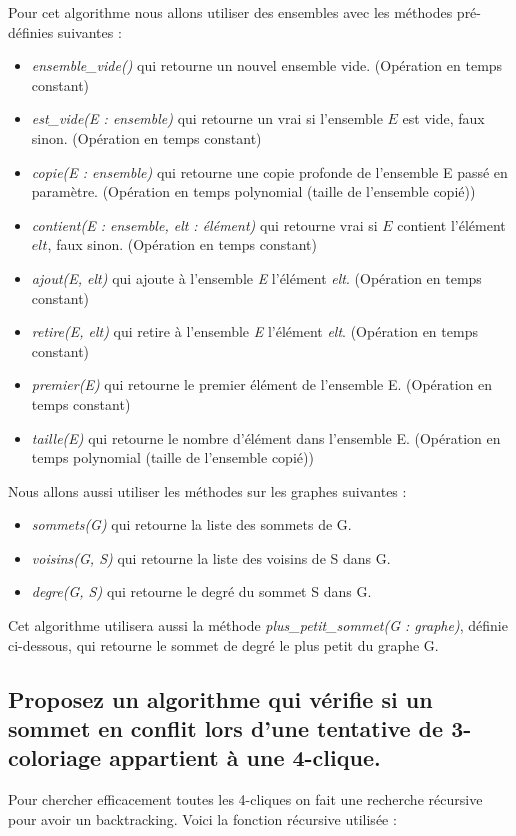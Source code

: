 \documentclass[a4paper, 11pt]{article}
\begin{document}
    Pour cet algorithme nous allons utiliser des ensembles avec les méthodes pré-définies suivantes :
    \begin{itemize}
        \item \emph{ensemble\_vide()} qui retourne un nouvel ensemble vide. (Opération en temps constant)
        \item \emph{est\_vide(E : ensemble)} qui retourne un vrai si l'ensemble $E$ est vide, faux sinon. (Opération en temps constant)
        \item \emph{copie(E : ensemble)} qui retourne une copie profonde de l'ensemble E passé en paramètre. (Opération en temps polynomial (taille de l'ensemble copié))
        \item \emph{contient(E : ensemble, elt : élément)} qui retourne vrai si $E$ contient l'élément $elt$, faux sinon. (Opération en temps constant)
        \item \emph{ajout(E, elt)} qui ajoute à l'ensemble \emph{E} l'élément \emph{elt}. (Opération en temps constant)
        \item \emph{retire(E, elt)} qui retire à l'ensemble \emph{E} l'élément \emph{elt}. (Opération en temps constant)
        \item \emph{premier(E)} qui retourne le premier élément de l'ensemble E. (Opération en temps constant)
        \item \emph{taille(E)} qui retourne le nombre d'élément dans l'ensemble E. (Opération en temps polynomial (taille de l'ensemble copié))
    \end{itemize}

    \bigskip
    Nous allons aussi utiliser les méthodes sur les graphes suivantes :
    \begin{itemize}
        \item \emph{sommets(G)} qui retourne la liste des sommets de G\@.
        \item \emph{voisins(G, S)} qui retourne la liste des voisins de S dans G\@.
        \item \emph{degre(G, S)} qui retourne le degré du sommet S dans G\@.
    \end{itemize}

    Cet algorithme utilisera aussi la méthode \emph{plus\_petit\_sommet(G : graphe)},
    définie ci-dessous, qui retourne le sommet de degré le plus petit du graphe G\@.

    
    

    \subsection{Proposez un algorithme qui vérifie si un sommet en conflit lors d’une tentative de 3-coloriage
    appartient à une 4-clique.}\label{subsec:Q3C}
    Pour chercher efficacement toutes les 4-cliques on fait une recherche récursive pour avoir un backtracking.
    Voici la fonction récursive utilisée :
    
    \newpage
\end{document}
